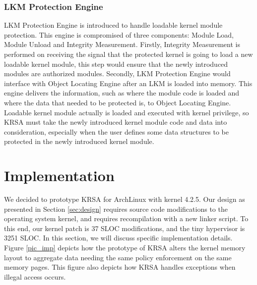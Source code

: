 \documentclass[conference]{IEEEtran}
\begin{document}
\subsubsection{LKM Protection Engine}\label{sec:lkmdesign}
LKM Protection Engine is introduced to handle loadable kernel module protection. This engine is compromised of three components: Module Load, Module Unload and Integrity Measurement. 
Firstly, Integrity Measurement is performed on receiving the signal that the protected kernel is going to load a new loadable kernel module, this step would ensure that the newly introduced modules are authorized modules. Secondly, LKM Protection Engine would interface with Object Locating Engine after an LKM is loaded into memory. This engine delivers the information, such as where the module code is loaded and where the data that needed to be protected is, to Object Locating Engine. Loadable kernel module actually is loaded and executed with kernel privilege, so KRSA must take the newly introduced kernel module code and data into consideration, especially when the user defines some data structures to be protected in the newly introduced kernel module. 



\section{Implementation} \label{sec:imp}
We decided to prototype KRSA for ArchLinux with kernel 4.2.5. 
Our design as presented in Section \ref{sec:design} requires source code modifications to the operating system kernel, and requires recompilation with a new linker script.
To this end, our kernel patch is 37 SLOC modifications, and the tiny hypervisor is 3251 SLOC. 
In this section, we will discuss specific implementation details. Figure \ref{pic_imp} depicts how the prototype of KRSA alters the kernel memory layout to aggregate data needing the same policy enforcement on the same memory pages. This figure also depicts how KRSA handles exceptions when illegal access occurs. 
\end{document}
